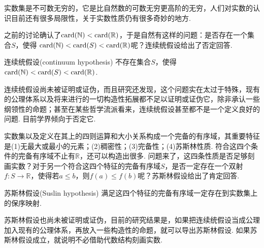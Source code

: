 \documentclass[main.tex]{subfiles}
\begin{document}
实数集是不可数无穷的，它是比自然数的可数无穷更高阶的无穷，人们对实数的认识目前还有很多局限性，关于实数性质仍有很多奇妙的地方.

之前的讨论确认了\({\rm card}(\mathbb{N})<{\rm card}(\mathbb{R})\)，于是自然有这样的问题：是否存在一个集合\(S\)，使得 \({\rm card}(\mathbb{N}) < {\rm card}(S) < {\rm card}(\mathbb{R})\)呢？连续统假设给出了否定回答.

\begin{proposition}{连续统假设(continuum hypothesis)}
    不存在集合\(S\)，使得\({\rm card}(\mathbb{N})<{\rm card}(S)<{\rm card}(\mathbb{R})\).
\end{proposition}

连续统假设尚未被证明或证伪，而且研究还发现，这个问题实在太过于特殊，现有的公理体系以及将来进行的一切构造性拓展都不足以证明或证伪它，除非承认一些纲领性的命题；甚至在某些哲学流派看来，连续统假设甚至都不是一个定义良好的问题. 目前学界倾向于否定它.

实数集以及定义在其上的四则运算和大小关系构成一个完备的有序域，其重要特征是(1)无最大或最小的元素；(2)稠密性；(3)完备性；(4)苏斯林性质. 符合这四个条件的完备有序域不止有\(\mathbb{R}\)，还可以构造出很多. 问题来了，这四条性质是否足够刻画实数？对于另一个符合这四个特征的完备有序域\(S\)，是否一定存在一个双射\(f:S\to \mathbb{R}\)，使得若\(a\leq b\)，则\(f(a)\leq f(b)\)呢？苏斯林假设给出了肯定回答.
\begin{proposition}{苏斯林假设(Suslin hypothesis)}
    满足这四个特征的完备有序域一定存在到实数集上的保序映射.
\end{proposition}

苏斯林假设也尚未被证明或证伪，目前的研究结果是，如果把连续统假设当成公理加入现有的公理体系，再放入一些构造性的命题，就可以导出苏斯林假设. 如果苏斯林假设成立，就说明不必借助代数结构刻画实数.

\vspace{1cm}
\end{document}
